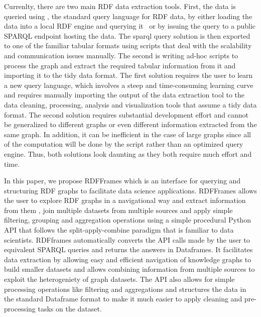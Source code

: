 Currenlty, there are two main RDF data extraction tools. First, the data is queried using \sparql, the standard query language for RDF data, by either loading the data into a local RDF engine and
querying it~\cite{rdf-3x} or by issuing the query  
to a public SPARQL endpoint hosting the data. The sparql query solution is then exported to one of the familiar tabular formats using scripts that deal with the scalability and communication issues manually. 
The second is writing ad-hoc scripts to process the graph and extract the required tabular information from it and importing it to the tidy data format. The first solution requires the user to learn a new query language, which involves a steep and time-consuming learning curve and requires manually importing the output of the data extraction tool \sparql to the data cleaning, processing, analysis and visualization tools that assume a tidy data format. The second solution requires substantial development effort and cannot be generalized to different graphs or even different information extracted from the same graph. In addition, it can be inefficient in the case of large graphs since all of the computation will be done by the script rather than an optimized query engine. Thus, both solutions look daunting as they both require much effort and time.

In this paper, we propose RDFFrames which is an interface for querying and structuring RDF graphs to facilitate data science applications. RDFFrames allows the user to explore RDF graphs in a navigational way and extract information from them %
, join multiple datasets from multiple sources and apply simple filtering, grouping and aggregation operations using a simple procedural Python API that follows the split-apply-combine paradigm that is familiar to data scientists. RDFframes automatically converts the API calls made by the user to equivalent SPARQL queries and returns the answers in Dataframes. It facilitates data extraction by allowing easy and efficient navigation of knowledge graphs to build smaller datasets and allows combining information from multiple sources to exploit the heterogeniety of graph datasets. The API also allows for simple processing operations like filtering and aggregations and structures the data in the standard Dataframe format to make it much easier to apply cleaning and pre-processing tasks on the dataset. 


